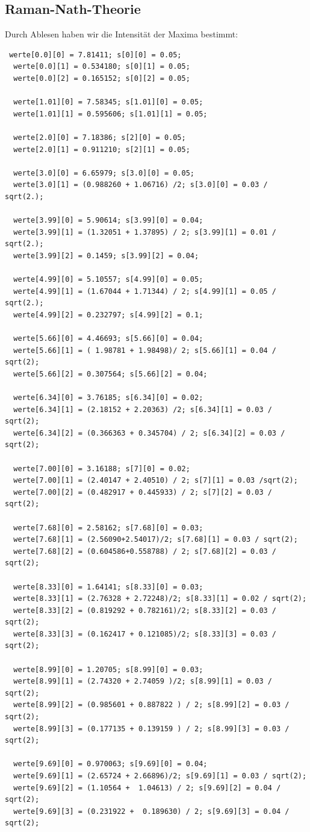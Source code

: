\subsection{Raman-Nath-Theorie}
Durch Ablesen haben wir die Intensität der Maxima bestimmt: 
\begin{verbatim}
 werte[0.0][0] = 7.81411; s[0][0] = 0.05;
  werte[0.0][1] = 0.534180; s[0][1] = 0.05;
  werte[0.0][2] = 0.165152; s[0][2] = 0.05;
  
  werte[1.01][0] = 7.58345; s[1.01][0] = 0.05;
  werte[1.01][1] = 0.595606; s[1.01][1] = 0.05;

  werte[2.0][0] = 7.18386; s[2][0] = 0.05;
  werte[2.0][1] = 0.911210; s[2][1] = 0.05;
  
  werte[3.0][0] = 6.65979; s[3.0][0] = 0.05;
  werte[3.0][1] = (0.988260 + 1.06716) /2; s[3.0][0] = 0.03 / sqrt(2.);
  
  werte[3.99][0] = 5.90614; s[3.99][0] = 0.04;
  werte[3.99][1] = (1.32051 + 1.37895) / 2; s[3.99][1] = 0.01 / sqrt(2.);
  werte[3.99][2] = 0.1459; s[3.99][2] = 0.04;
  
  werte[4.99][0] = 5.10557; s[4.99][0] = 0.05;
  werte[4.99][1] = (1.67044 + 1.71344) / 2; s[4.99][1] = 0.05 / sqrt(2.);
  werte[4.99][2] = 0.232797; s[4.99][2] = 0.1;
  
  werte[5.66][0] = 4.46693; s[5.66][0] = 0.04;
  werte[5.66][1] = ( 1.98781 + 1.98498)/ 2; s[5.66][1] = 0.04 / sqrt(2);
  werte[5.66][2] = 0.307564; s[5.66][2] = 0.04;
  
  werte[6.34][0] = 3.76185; s[6.34][0] = 0.02;
  werte[6.34][1] = (2.18152 + 2.20363) /2; s[6.34][1] = 0.03 / sqrt(2);
  werte[6.34][2] = (0.366363 + 0.345704) / 2; s[6.34][2] = 0.03 / sqrt(2);
  
  werte[7.00][0] = 3.16188; s[7][0] = 0.02;
  werte[7.00][1] = (2.40147 + 2.40510) / 2; s[7][1] = 0.03 /sqrt(2);
  werte[7.00][2] = (0.482917 + 0.445933) / 2; s[7][2] = 0.03 / sqrt(2);
  
  werte[7.68][0] = 2.58162; s[7.68][0] = 0.03;
  werte[7.68][1] = (2.56090+2.54017)/2; s[7.68][1] = 0.03 / sqrt(2);
  werte[7.68][2] = (0.604586+0.558788) / 2; s[7.68][2] = 0.03 / sqrt(2);
  
  werte[8.33][0] = 1.64141; s[8.33][0] = 0.03;
  werte[8.33][1] = (2.76328 + 2.72248)/2; s[8.33][1] = 0.02 / sqrt(2);
  werte[8.33][2] = (0.819292 + 0.782161)/2; s[8.33][2] = 0.03 / sqrt(2);
  werte[8.33][3] = (0.162417 + 0.121085)/2; s[8.33][3] = 0.03 / sqrt(2);
  
  werte[8.99][0] = 1.20705; s[8.99][0] = 0.03;
  werte[8.99][1] = (2.74320 + 2.74059 )/2; s[8.99][1] = 0.03 / sqrt(2);
  werte[8.99][2] = (0.985601 + 0.887822 ) / 2; s[8.99][2] = 0.03 / sqrt(2);
  werte[8.99][3] = (0.177135 + 0.139159 ) / 2; s[8.99][3] = 0.03 / sqrt(2);
  
  werte[9.69][0] = 0.970063; s[9.69][0] = 0.04;
  werte[9.69][1] = (2.65724 + 2.66896)/2; s[9.69][1] = 0.03 / sqrt(2);
  werte[9.69][2] = (1.10564 +  1.04613) / 2; s[9.69][2] = 0.04 / sqrt(2);
  werte[9.69][3] = (0.231922 +  0.189630) / 2; s[9.69][3] = 0.04 / sqrt(2);
\end{verbatim}
 
